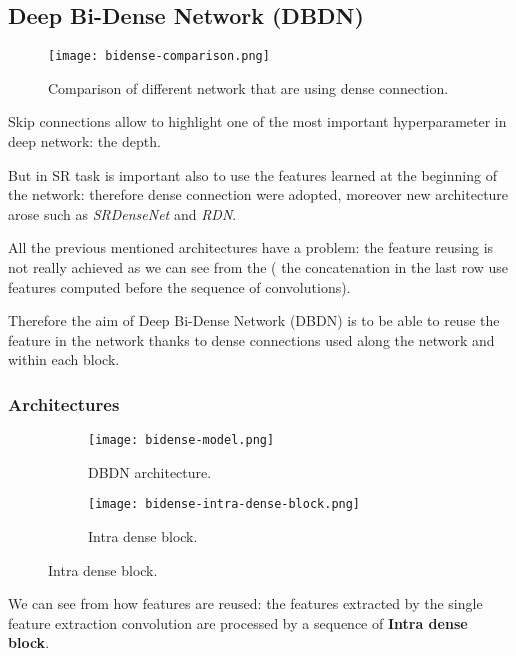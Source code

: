 \subsection{Deep Bi-Dense Network (DBDN\cite{DBDN})}\label{dbdn}
\begin{figure}
    \centering
    \texttt{[image: bidense-comparison.png]}
    \caption{Comparison of different network that are using dense connection.}\label{dbdn:comparison}
\end{figure}

Skip connections allow to highlight one of the most important hyperparameter in deep network: the depth.

But in SR task is important also to use the features learned at the beginning of the network: therefore dense connection were adopted, moreover new architecture arose such as \textit{SRDenseNet} and \textit{RDN}.

All the previous mentioned architectures have a problem: the feature reusing is not really achieved as we can see from the  ( the concatenation in the last row use features computed before the sequence of convolutions).

Therefore the aim of Deep Bi-Dense Network (DBDN) is to be able to reuse the feature in the network thanks to dense connections used along the network and within each block.

\subsubsection{Architectures}
\begin{figure}
    \begin{subfigure}{\textwidth}
        \centering
        \texttt{[image: bidense-model.png]}
        \caption{DBDN architecture.}\label{dbdn:architecture}            
    \end{subfigure}
    \begin{subfigure}{\textwidth}
        \centering
        \texttt{[image: bidense-intra-dense-block.png]}
        \caption{Intra dense block.}\label{dbdn:idb}   
    \end{subfigure}


\end{figure}

We can see from  how features are reused: the features extracted by the single feature extraction convolution are processed by a sequence of \textbf{Intra dense block}.

